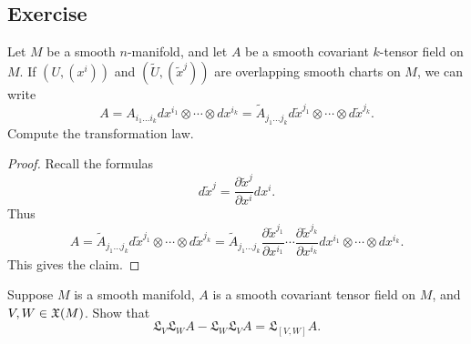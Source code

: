 \subsection{Exercise}
\begin{exercise}
Let $M$ be a smooth $n$-manifold, and let $A$ be a smooth covariant $k$-tensor field on $M$. If $(U,(x^i))$ and $(\widetilde{U},(\widetilde{x}^j))$ are overlapping smooth charts on $M$, we can write
\[A=A_{i_1\dots i_k}dx^{i_1}\otimes\cdots\otimes dx^{i_k}=\widetilde{A}_{j_1\dots j_k}d\widetilde{x}^{j_1}\otimes\cdots\otimes d\widetilde{x}^{j_k}.\]
Compute the transformation law.
\end{exercise}
\begin{proof}
Recall the formulas
\[ d\widetilde{x}^j=\frac{\partial\widetilde{x}^j}{\partial x^i}dx^i.\]
Thus
\[A=\widetilde{A}_{j_1\dots j_k}d\widetilde{x}^{j_1}\otimes\cdots\otimes d\widetilde{x}^{j_k}=\widetilde{A}_{j_1\dots j_k}\frac{\partial\widetilde{x}^{j_1}}{\partial x^{i_1}}\cdots\frac{\partial\widetilde{x}^{j_k}}{\partial x^{i_k}}dx^{i_1}\otimes\cdots\otimes dx^{i_k}.\]
This gives the claim.
\end{proof}
\begin{exercise}\label{tensor field Lie derivative bracket}
Suppose $M$ is a smooth manifold, $A$ is a smooth covariant tensor field on $M$, and $V,W\in\mathfrak{X}(M)$. Show that
\[\mathfrak{L}_V\mathfrak{L}_WA-\mathfrak{L}_W\mathfrak{L}_VA=\mathfrak{L}_{[V,W]}A.\]
\end{exercise}
